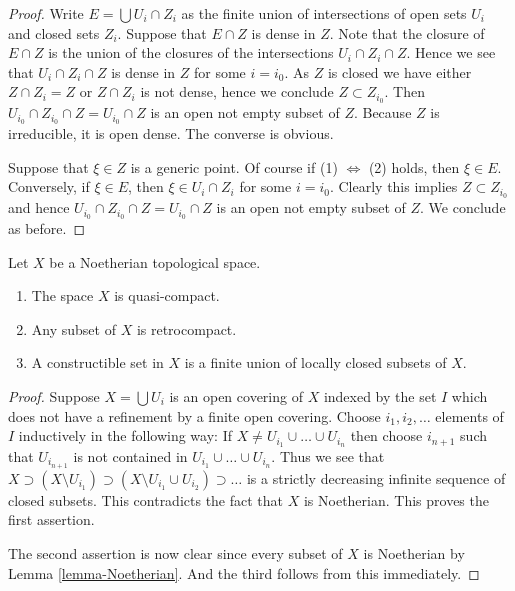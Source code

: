 \begin{proof}
Write $E = \bigcup U_i \cap Z_i$ as the finite union of
intersections of open sets $U_i$ and closed sets $Z_i$.
Suppose that $E \cap Z$ is dense in $Z$. Note that
the closure of $E \cap Z$ is the union of the closures
of the intersections $U_i \cap Z_i \cap Z$. Hence we
see that $U_i \cap Z_i \cap Z$ is dense in $Z$ for some $i = i_0$.
As $Z$ is closed we have either $Z \cap Z_i = Z$ or
$Z \cap Z_i$ is not dense, hence we conclude $Z \subset Z_{i_0}$.
Then $U_{i_0} \cap Z_{i_0} \cap Z = U_{i_0} \cap Z$ is an open
not empty subset of $Z$. Because $Z$ is irreducible, it is open dense.
The converse is obvious.

\medskip\noindent
Suppose that $\xi \in Z$ is a generic point. Of course if
(1) $\Leftrightarrow$ (2) holds, then $\xi \in E$. Conversely,
if $\xi \in E$, then $\xi \in U_i \cap Z_i$ for some $i = i_0$.
Clearly this implies $Z \subset Z_{i_0}$ and hence
$U_{i_0} \cap Z_{i_0} \cap Z = U_{i_0} \cap Z$ is an open
not empty subset of $Z$. We conclude as before.
\end{proof}

\begin{lemma}
\label{lemma-constructible-Noetherian-space}
Let $X$ be a Noetherian topological space.
\begin{enumerate}
\item The space $X$ is quasi-compact.
\item Any subset of $X$ is retrocompact.
\item A constructible set in $X$ is a finite union
of locally closed subsets of $X$.
\end{enumerate}
\end{lemma}

\begin{proof}
Suppose $X = \bigcup U_i$ is an open covering of $X$ indexed
by the set $I$ which does not have a refinement by a finite
open covering. Choose $i_1, i_2, \ldots $ elements of $I$ inductively
in the following way: If $X \not = U_{i_1} \cup \ldots \cup U_{i_n}$
then choose $i_{n + 1}$ such that $U_{i_{n + 1}}$ is not contained
in $U_{i_1} \cup \ldots \cup U_{i_n}$. Thus we see that
$X \supset (X \setminus U_{i_1}) \supset
(X \setminus U_{i_1} \cup U_{i_2}) \supset \ldots$ is a strictly
decreasing infinite sequence of closed subsets. This contradicts
the fact that $X$ is Noetherian. This proves the first assertion.

\medskip\noindent
The second assertion is now clear since every subset of $X$ is
Noetherian by Lemma \ref{lemma-Noetherian}. And the third follows
from this immediately.
\end{proof}







